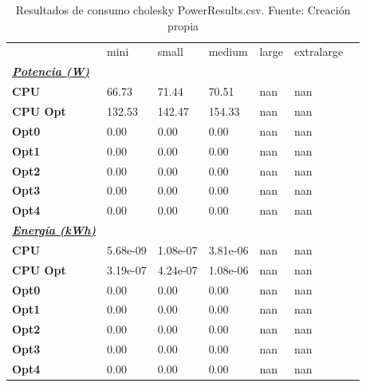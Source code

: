 \begin{table}[H]
    \centering
    \begin{tabular}{lllllll}
    \rowcolor[HTML]{DAE8FC} \ & mini & small & medium & 	large & 	extralarge \\
    \cellcolor[HTML]{DAE8FC} \textbf{\textbf{{\emph{{\underline{{Potencia (W)}}}}}}} &  &  &  & 	 & 	 \\
    \rowcolor[HTML]{EFEFEF} \cellcolor[HTML]{DAE8FC} \textbf{CPU} & 66.73 & 71.44 & 70.51 & 	nan & 	nan \\
    \cellcolor[HTML]{DAE8FC} \textbf{CPU Opt} & 132.53 & 142.47 & 154.33 & 	nan & 	nan \\
    \rowcolor[HTML]{EFEFEF} \cellcolor[HTML]{DAE8FC} \textbf{Opt0} & 0.00 & 0.00 & 0.00 & 	nan & 	nan \\
    \cellcolor[HTML]{DAE8FC} \textbf{Opt1} & 0.00 & 0.00 & 0.00 & 	nan & 	nan \\
    \rowcolor[HTML]{EFEFEF} \cellcolor[HTML]{DAE8FC} \textbf{Opt2} & 0.00 & 0.00 & 0.00 & 	nan & 	nan \\
    \cellcolor[HTML]{DAE8FC} \textbf{Opt3} & 0.00 & 0.00 & 0.00 & 	nan & 	nan \\
    \rowcolor[HTML]{EFEFEF} \cellcolor[HTML]{DAE8FC} \textbf{Opt4} & 0.00 & 0.00 & 0.00 & 	nan & 	nan \\
    \cellcolor[HTML]{DAE8FC} \textbf{\textbf{{\emph{{\underline{{Energía (kWh)}}}}}}} &  &  &  & 	 & 	 \\
    \rowcolor[HTML]{EFEFEF} \cellcolor[HTML]{DAE8FC} \textbf{CPU} & 5.68e-09 & 1.08e-07 & 3.81e-06 & 	nan & 	nan \\
    \cellcolor[HTML]{DAE8FC} \textbf{CPU Opt} & 3.19e-07 & 4.24e-07 & 1.08e-06 & 	nan & 	nan \\
    \rowcolor[HTML]{EFEFEF} \cellcolor[HTML]{DAE8FC} \textbf{Opt0} & 0.00 & 0.00 & 0.00 & 	nan & 	nan \\
    \cellcolor[HTML]{DAE8FC} \textbf{Opt1} & 0.00 & 0.00 & 0.00 & 	nan & 	nan \\
    \rowcolor[HTML]{EFEFEF} \cellcolor[HTML]{DAE8FC} \textbf{Opt2} & 0.00 & 0.00 & 0.00 & 	nan & 	nan \\
    \cellcolor[HTML]{DAE8FC} \textbf{Opt3} & 0.00 & 0.00 & 0.00 & 	nan & 	nan \\
    \rowcolor[HTML]{EFEFEF} \cellcolor[HTML]{DAE8FC} \textbf{Opt4} & 0.00 & 0.00 & 0.00 & 	nan & 	nan \\
    \end{tabular}
    \caption[Resultados de consumo cholesky PowerResults.csv]{{Resultados de consumo cholesky PowerResults.csv. Fuente: Creación propia}}
    \label{table_global_cholesky_PowerResults_data}
\end{table}